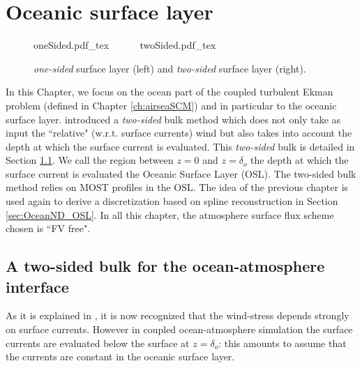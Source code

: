 \chapter{Oceanic surface layer}
\label{ch:OceanND}
\minitoc
\begin{figure}
	\centering
	{oneSided.pdf_tex}
	~~~~~
	{twoSided.pdf_tex}
	\caption{\textit{one-sided} surface layer
	(left) and \textit{two-sided} surface layer (right).}
	\label{fig:OceanND_twoSidedBulk_drawing}
\end{figure}
In this Chapter, we focus on the ocean part of the coupled turbulent
Ekman problem (defined in Chapter \ref{ch:airseaSCM})
and in particular to the oceanic surface layer.
\citep{pelletier_two-sided_2021} introduced a \textit{two-sided}
bulk method which does not only take as input
the ``relative" (w.r.t. surface currents) wind but also takes into
account the depth at which the surface current is evaluated.
This \textit{two-sided} bulk is detailed in Section
\ref{sec:OceanND_twoSidedBulk}.
We call the region between $z=0$ and
$z=\delta_o$ the depth at which the surface current is evaluated
the Oceanic Surface Layer (OSL).
The two-sided bulk method relies on MOST profiles in the OSL.
The idea of the previous chapter is used again to
derive a discretization based on spline reconstruction
in Section \ref{sec:OceanND_OSL}.
In all this chapter, the atmosphere surface flux scheme chosen
is ``FV free".
\section{A two-sided bulk for the ocean-atmosphere interface}
\label{sec:OceanND_twoSidedBulk}
As it is explained in \citep{pelletier_two-sided_2021}, it is now
recognized that the wind-stress depends strongly on surface currents. 
However in coupled ocean-atmosphere simulation
the surface currents are evaluated below the surface at $z=\delta_o$:
this amounts to assume that the currents are constant in the
oceanic surface layer.

